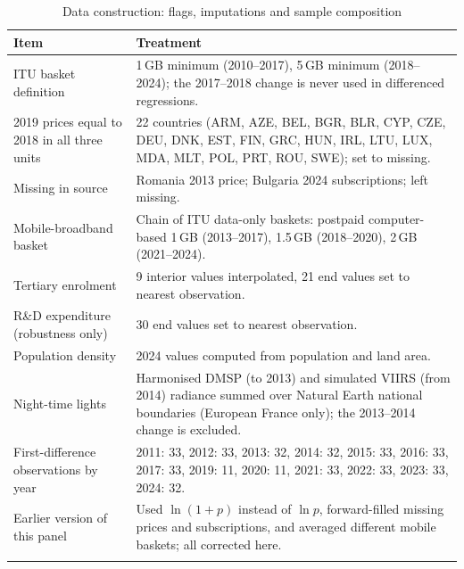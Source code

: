 \documentclass[pdflatex,sn-basic]{sn-jnl}
\begin{document}
\begin{table}[h]
\caption{Data construction: flags, imputations and sample composition}\label{tab:S6}
\footnotesize
\begin{tabular*}{\textwidth}{@{\extracolsep{\fill}}p{4.2cm}p{8.2cm}@{}}
\toprule
Item & Treatment \\
\midrule
ITU basket definition & 1\,GB minimum (2010--2017), 5\,GB minimum (2018--2024); the 2017--2018 change is never used in differenced regressions.\\
2019 prices equal to 2018 in all three units & 22 countries (ARM, AZE, BEL, BGR, BLR, CYP, CZE, DEU, DNK, EST, FIN, GRC, HUN, IRL, LTU, LUX, MDA, MLT, POL, PRT, ROU, SWE); set to missing.\\
Missing in source & Romania 2013 price; Bulgaria 2024 subscriptions; left missing.\\
Mobile-broadband basket & Chain of ITU data-only baskets: postpaid computer-based 1\,GB (2013--2017), 1.5\,GB (2018--2020), 2\,GB (2021--2024).\\
Tertiary enrolment & 9 interior values interpolated, 21 end values set to nearest observation.\\
R\&D expenditure (robustness only) & 30 end values set to nearest observation.\\
Population density & 2024 values computed from population and land area.\\
Night-time lights & Harmonised DMSP (to 2013) and simulated VIIRS (from 2014) radiance summed over Natural Earth national boundaries (European France only); the 2013--2014 change is excluded.\\
First-difference observations by year & 2011: 33, 2012: 33, 2013: 32, 2014: 32, 2015: 33, 2016: 33, 2017: 33, 2019: 11, 2020: 11, 2021: 33, 2022: 33, 2023: 33, 2024: 32.\\
Earlier version of this panel & Used $\ln(1+p)$ instead of $\ln p$, forward-filled missing prices and subscriptions, and averaged different mobile baskets; all corrected here.\\
\botrule
\end{tabular*}
\end{table}
\end{document}
